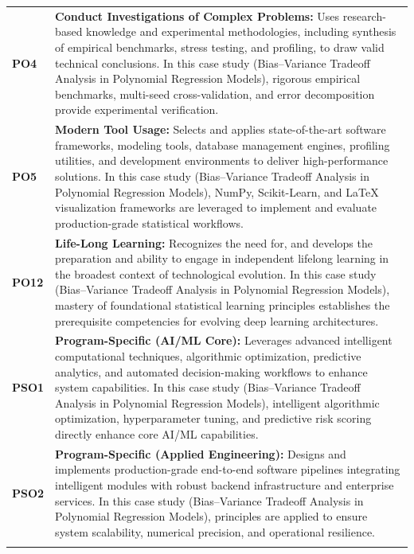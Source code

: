 {\begin{longtable}{@{}>{\centering\arraybackslash}p{1.8cm} p{13.2cm}@{}}
    \addlinespace
\textbf{PO4} & \textbf{Conduct Investigations of Complex Problems:} Uses research-based knowledge and experimental methodologies, including synthesis of empirical benchmarks, stress testing, and profiling, to draw valid technical conclusions. In this case study (Bias--Variance Tradeoff Analysis in Polynomial Regression Models), rigorous empirical benchmarks, multi-seed cross-validation, and error decomposition provide experimental verification. \\
    \addlinespace
\textbf{PO5} & \textbf{Modern Tool Usage:} Selects and applies state-of-the-art software frameworks, modeling tools, database management engines, profiling utilities, and development environments to deliver high-performance solutions. In this case study (Bias--Variance Tradeoff Analysis in Polynomial Regression Models), NumPy, Scikit-Learn, and LaTeX visualization frameworks are leveraged to implement and evaluate production-grade statistical workflows. \\
    \addlinespace
\textbf{PO12} & \textbf{Life-Long Learning:} Recognizes the need for, and develops the preparation and ability to engage in independent lifelong learning in the broadest context of technological evolution. In this case study (Bias--Variance Tradeoff Analysis in Polynomial Regression Models), mastery of foundational statistical learning principles establishes the prerequisite competencies for evolving deep learning architectures. \\
    \addlinespace
\textbf{PSO1} & \textbf{Program-Specific (AI/ML Core):} Leverages advanced intelligent computational techniques, algorithmic optimization, predictive analytics, and automated decision-making workflows to enhance system capabilities. In this case study (Bias--Variance Tradeoff Analysis in Polynomial Regression Models), intelligent algorithmic optimization, hyperparameter tuning, and predictive risk scoring directly enhance core AI/ML capabilities. \\
    \addlinespace
\textbf{PSO2} & \textbf{Program-Specific (Applied Engineering):} Designs and implements production-grade end-to-end software pipelines integrating intelligent modules with robust backend infrastructure and enterprise services. In this case study (Bias--Variance Tradeoff Analysis in Polynomial Regression Models), principles are applied to ensure system scalability, numerical precision, and operational resilience. \\
    \addlinespace
    \bottomrule
\end{longtable}}